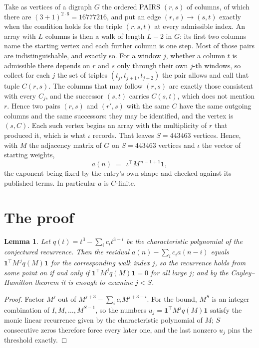 \documentclass[11pt,a4paper]{article}
\theoremstyle{plain}
\newtheorem{lemma}[theorem]{Lemma}
\theoremstyle{definition}
\begin{document}
Take as vertices of a digraph $G$ the ordered PAIRS $(r,s)$ of columns, of which there are
$(3+1)^{2\cdot6}=16777216$, and put an edge $(r,s)\to(s,t)$ exactly when the condition
holds for the triple $(r,s,t)$ at every admissible index. An array with $L$ columns is then a
walk of length $L-2$ in $G$: its first two columns name the starting vertex and each further
column is one step. Most of those pairs are indistinguishable, and exactly so. For a window $j$, whether a column $t$ is admissible there depends on $r$ and $s$ only through their own $j$-th windows, so collect for each $j$ the set of triples $(t_j,t_{j+1},t_{j+2})$ the pair allows and call that tuple $C(r,s)$. The columns that may follow $(r,s)$ are exactly those consistent with every $C_j$, and the successor $(s,t)$ carries $C(s,t)$, which does not mention $r$. Hence two pairs $(r,s)$ and $(r',s)$ with the same $C$ have the same outgoing columns and the same successors: they may be identified, and the vertex is $(s,C)$. Each such vertex begins an array with the multiplicity of $r$ that produced it, which is what $\iota$ records. That leaves $S=443463$ vertices. Hence, with $M$ the adjacency matrix of $G$ on $S=443463$ vertices and
$\iota$ the vector of starting weights,
\[
a(n)\;=\;\,\iota^{\!\top}M^{\,n-1+1}\mathbf{1},
\]
the exponent being fixed by the entry's own shape and checked against its published terms.
In particular $a$ is $C$-finite.

\section{The proof}

\begin{lemma}\label{lem:crit}
Let $q(t)=t^{3}-\sum_i c_it^{3-i}$ be the characteristic polynomial of the
conjectured recurrence. Then the residual $a(n)-\sum_ic_ia(n-i)$ equals
$\mathbf{1}^{\!\top}M^{\,j}q(M)\mathbf{1}$ for the corresponding walk index
$j$, so the recurrence holds from some point on if and only if
$\mathbf{1}^{\!\top}M^{j}q(M)\mathbf{1}=0$ for all large $j$; and by the
Cayley--Hamilton theorem it is enough to examine $j<S$.
\end{lemma}

\begin{proof}
Factor $M^{j}$ out of $M^{j+3}-\sum_ic_iM^{j+3-i}$. For the bound, $M^{S}$
is an integer combination of $I,M,\dots,M^{S-1}$, so the numbers
$u_j=\mathbf{1}^{\!\top}M^{j}q(M)\mathbf{1}$ satisfy the monic linear recurrence given by
the characteristic polynomial of $M$; $S$ consecutive zeros therefore force every later one,
and the last nonzero $u_j$ pins the threshold exactly.
\end{proof}
\end{document}
